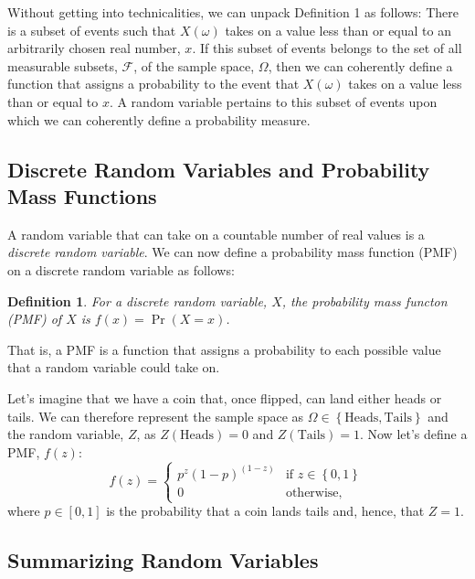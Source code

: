 \documentclass[12pt,leqno]{article}
\theoremstyle{newstyle}
\newtheorem{definition}{Definition}
\begin{document}
Without getting into technicalities, we can unpack Definition 1 as
follows: There is a subset of events such that \(X\left(\omega\right)\)
takes on a value less than or equal to an arbitrarily chosen real
number, \(x\). If this subset of events belongs to the set of all
measurable subsets, \(\mathcal{F}\), of the sample space, \(\Omega\),
then we can coherently define a function that assigns a probability to
the event that \(X\left(\omega\right)\) takes on a value less than or
equal to \(x\). A random variable pertains to this subset of events upon
which we can coherently define a probability measure.

\hypertarget{discrete-random-variables-and-probability-mass-functions}{%
\subsection{Discrete Random Variables and Probability Mass
Functions}\label{discrete-random-variables-and-probability-mass-functions}}

A random variable that can take on a countable number of real values is
a \textit{discrete random variable}. We can now define a probability
mass function (PMF) on a discrete random variable as follows:

\begin{definition}
For a discrete random variable, $X$, the probability mass functon (PMF) of $X$ is $f\left(x\right) = \Pr\left(X = x\right)$.
\end{definition}

That is, a PMF is a function that assigns a probability to each possible
value that a random variable could take on.

Let's imagine that we have a coin that, once flipped, can land either
heads or tails. We can therefore represent the sample space as
\(\Omega \in \left\{\text{Heads}, \text{Tails} \right\}\) and the random
variable, \(Z\), as \(Z\left(\text{Heads}\right) = 0\) and
\(Z\left(\text{Tails}\right) = 1\). Now let's define a PMF, \(f(z)\):
\begin{equation}
f(z) =
\begin{cases}
p^z\left(1 - p\right)^{(1 - z)} & \text{if } z \in \left\{0, 1\right\} \\
0 & \text{otherwise},
\end{cases}
\end{equation} where \(p \in [0, 1]\) is the probability that a coin
lands tails and, hence, that \(Z = 1\).

\hypertarget{summarizing-random-variables}{%
\subsection{Summarizing Random
Variables}\label{summarizing-random-variables}}
\end{document}
